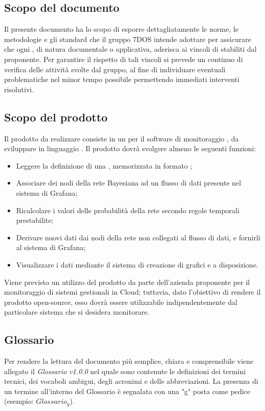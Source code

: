 \subsection{Scopo del documento}
Il presente documento ha lo scopo di esporre dettagliatamente le norme, le metodologie e gli standard che il gruppo 7DOS intende adottare per assicurare che ogni , di natura documentale o applicativa, aderisca ai vincoli di  stabiliti dal proponente. Per garantire il rispetto di tali vincoli si prevede un continuo  di verifica delle attività svolte dal gruppo, al fine di individuare eventuali problematiche nel minor tempo possibile permettendo immediati interventi risolutivi.
\subsection{Scopo del prodotto}
Il prodotto da realizzare consiste in un  per il software di monitoraggio , da sviluppare in linguaggio . Il prodotto dovrà svolgere almeno le seguenti funzioni:
\begin{itemize}
	\item{Leggere la definizione di una , memorizzata in formato ;}
	\item{Associare dei nodi della rete Bayesiana ad un flusso di dati presente nel sistema di Grafana;}
	\item{Ricalcolare i valori delle probabilità della rete secondo regole temporali prestabilite;}
	\item{Derivare nuovi dati dai nodi della rete non collegati al flusso di dati, e fornirli al sistema di Grafana;}
	\item{Visualizzare i dati mediante il sistema di creazione di grafici e  a disposizione.}
\end{itemize}
Viene previsto un utilizzo del prodotto da parte dell'azienda proponente per il monitoraggio di sistemi gestionali in Cloud; tuttavia, dato l'obiettivo di rendere il prodotto open-source, esso dovrà essere utilizzabile indipendentemente dal particolare sistema che si desidera monitorare.
\subsection{Glossario}
Per rendere la lettura del documento più semplice, chiara e comprensibile viene allegato il \emph{Glossario v1.0.0} nel quale sono contenute le definizioni dei termini tecnici, dei vocaboli ambigui, degli acronimi e delle abbreviazioni. La presenza di un termine all'interno del Glossario è segnalata con una "g" posta come pedice (esempio: $Glossario_{g}$).
